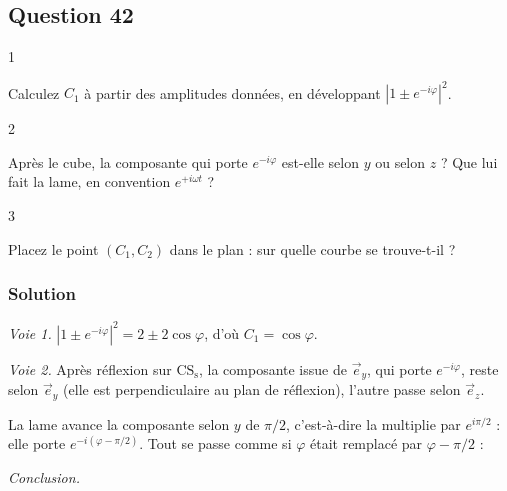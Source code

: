 \documentclass[11pt,a4paper]{article}
\newcommand{\equationajustee}[1]{%
  \sbox{\boiteequation}{$\displaystyle #1$}%
  \ifdim\wd\boiteequation>\linewidth
    \[\resizebox{\linewidth}{!}{\usebox{\boiteequation}}\]%
  \else
    \[#1\]%
  \fi}
\begin{document}
\hypertarget{question-42}{%
\subsection{Question 42}\label{question-42}}

\begin{indication}{1}

Calculez \(C_1\) à partir des amplitudes données, en développant \(|1\pm e^{-i\varphi}|^2\).

\end{indication}

\begin{indication}{2}

Après le cube, la composante qui porte \(e^{-i\varphi}\) est-elle selon \(y\) ou selon \(z\) ? Que lui fait la lame, en convention \(e^{+i\omega t}\) ?

\end{indication}

\begin{indication}{3}

Placez le point \((C_1,C_2)\) dans le plan : sur quelle courbe se trouve-t-il ?

\end{indication}

\hypertarget{solution-41}{%
\subsubsection{Solution}\label{solution-41}}

\emph{Voie 1.} \(|1\pm e^{-i\varphi}|^2=2\pm2\cos\varphi\), d'où \(C_1=\cos\varphi\).

\emph{Voie 2.} Après réflexion sur \(\mathrm{CS_s}\), la composante issue de \(\vec e_y\), qui porte \(e^{-i\varphi}\), reste selon \(\vec e_y\) (elle est perpendiculaire au plan de réflexion), l'autre passe selon \(\vec e_z\).

La lame avance la composante selon \(y\) de \(\pi/2\), c'est-à-dire la multiplie par \(e^{i\pi/2}\) : elle porte \(e^{-i(\varphi-\pi/2)}\). Tout se passe comme si \(\varphi\) était remplacé par \(\varphi-\pi/2\) :

\equationajustee{C_2=\cos\!\left(\varphi-\frac\pi2\right)=\sin\varphi}

\emph{Conclusion.}

\equationajustee{\boxed{\underline C=e^{i\varphi}}}

\equationajustee{\boxed{\varphi=\theta=\arg\underline C}}
\end{document}
